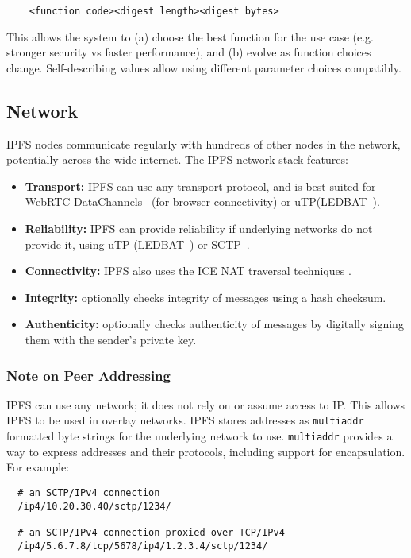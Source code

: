 \documentclass{sig-alternate}
\begin{document}
\begin{verbatim}
    <function code><digest length><digest bytes>
\end{verbatim}

This allows the system to (a) choose the best function for the use case (e.g. stronger security vs faster performance), and (b) evolve as function choices change. Self-describing values allow using different parameter choices compatibly.

\subsection{Network}

IPFS nodes communicate regularly with hundreds of other nodes in the network, potentially across the wide internet. The IPFS network stack features:

\begin{itemize}
  \item \textbf{Transport:} IPFS can use any transport protocol, and is best suited for WebRTC DataChannels~\cite{WebRTC} (for browser connectivity) or uTP(LEDBAT~\cite{LEDBAT}).
  \item \textbf{Reliability:} IPFS can provide reliability if underlying networks do not provide it, using uTP (LEDBAT~\cite{LEDBAT}) or SCTP~\cite{SCTP}.
  \item \textbf{Connectivity:} IPFS also uses the ICE NAT traversal techniques \cite{ICE}.
  \item \textbf{Integrity:} optionally checks integrity of messages using a hash checksum.
  \item \textbf{Authenticity:} optionally checks authenticity of messages by digitally signing them with the sender's private key.
\end{itemize}

\subsubsection{Note on Peer Addressing}

IPFS can use any network; it does not rely on or assume access to IP. This allows IPFS to be used in overlay networks. IPFS stores addresses as \texttt{multiaddr} formatted byte strings for the underlying network to use. \texttt{multiaddr} provides a way to express addresses and their protocols, including support for encapsulation. For example:

\begin{verbatim}
  # an SCTP/IPv4 connection
  /ip4/10.20.30.40/sctp/1234/

  # an SCTP/IPv4 connection proxied over TCP/IPv4
  /ip4/5.6.7.8/tcp/5678/ip4/1.2.3.4/sctp/1234/
\end{verbatim}
\end{document}
